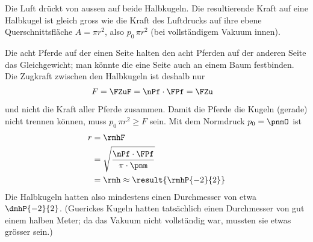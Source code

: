 \begin{center}
\end{center}
Die Luft drückt von aussen auf beide Halbkugeln. Die resultierende Kraft auf eine Halbkugel ist gleich gross wie die Kraft des Luftdrucks auf ihre ebene Querschnittsfläche $A = \pi r^2$, also $p_0\,\pi r^2$ (bei vollständigem Vakuum innen).

Die acht Pferde auf der einen Seite halten den acht Pferden auf der anderen Seite das Gleichgewicht; man könnte die eine Seite auch an einem Baum festbinden. Die Zugkraft zwischen den Halbkugeln ist deshalb nur
\begin{align}
 F &= \FZuF = \nPf\cdot\FPf = \FZu
\end{align}
und nicht die Kraft aller Pferde zusammen. Damit die Pferde die Kugeln (gerade) nicht trennen können, muss $p_0\,\pi r^2 \geq F$ sein. Mit dem Normdruck $p_0 = \pnmO$ ist
\begin{align}
 r &= \rmhF \\
   &= \sqrt{\frac{\nPf\cdot\FPf}{\pi\cdot\pnm}} \\
   &= \rmh \approx \result{\rmhP{-2}{2}}
\end{align}
Die Halbkugeln hatten also mindestens einen Durchmesser von etwa $\dmhP{-2}{2}$. (Guerickes Kugeln hatten tatsächlich einen Durchmesser von gut einem halben Meter; da das Vakuum nicht vollständig war, mussten sie etwas grösser sein.)
